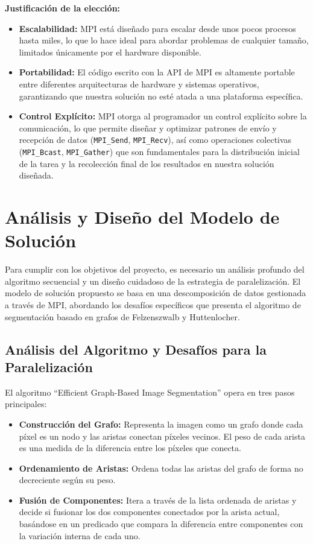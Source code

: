 \documentclass[fleqn,10pt]{article}
\begin{document}
\textbf{Justificación de la elección:}
\begin{itemize}
    \item \textbf{Escalabilidad:} MPI está diseñado para escalar desde unos pocos procesos hasta miles, lo que lo hace ideal para abordar problemas de cualquier tamaño, limitados únicamente por el hardware disponible.
    \item \textbf{Portabilidad:} El código escrito con la API de MPI es altamente portable entre diferentes arquitecturas de hardware y sistemas operativos, garantizando que nuestra solución no esté atada a una plataforma específica.
    \item \textbf{Control Explícito:} MPI otorga al programador un control explícito sobre la comunicación, lo que permite diseñar y optimizar patrones de envío y recepción de datos (\texttt{MPI\_Send}, \texttt{MPI\_Recv}), así como operaciones colectivas (\texttt{MPI\_Bcast}, \texttt{MPI\_Gather}) que son fundamentales para la distribución inicial de la tarea y la recolección final de los resultados en nuestra solución diseñada.
\end{itemize}

\section{Análisis y Diseño del Modelo de Solución}
Para cumplir con los objetivos del proyecto, es necesario un análisis profundo del algoritmo secuencial y un diseño cuidadoso de la estrategia de paralelización. El modelo de solución propuesto se basa en una descomposición de datos gestionada a través de MPI, abordando los desafíos específicos que presenta el algoritmo de segmentación basado en grafos de Felzenszwalb y Huttenlocher.

\subsection{Análisis del Algoritmo y Desafíos para la Paralelización}
El algoritmo ``Efficient Graph-Based Image Segmentation'' opera en tres pasos principales:

\begin{itemize}
    \item \textbf{Construcción del Grafo:} Representa la imagen como un grafo donde cada píxel es un nodo y las aristas conectan píxeles vecinos. El peso de cada arista es una medida de la diferencia entre los píxeles que conecta.
    \item \textbf{Ordenamiento de Aristas:} Ordena todas las aristas del grafo de forma no decreciente según su peso.
    \item \textbf{Fusión de Componentes:} Itera a través de la lista ordenada de aristas y decide si fusionar los dos componentes conectados por la arista actual, basándose en un predicado que compara la diferencia entre componentes con la variación interna de cada uno.
\end{itemize}
\end{document}
